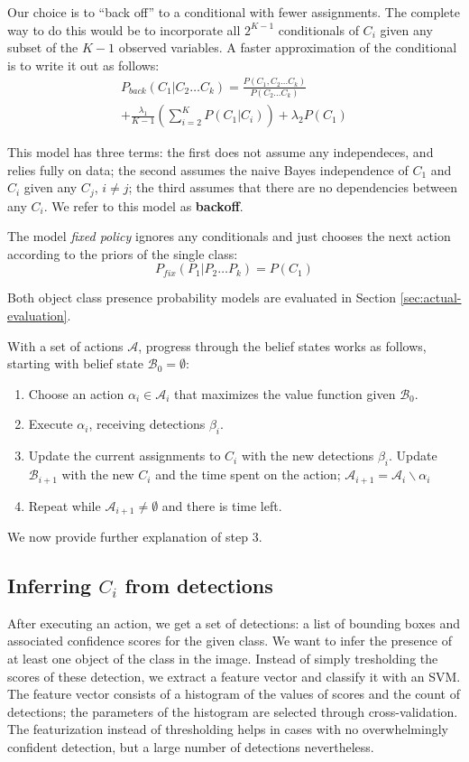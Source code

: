 Our choice is to ``back off'' to a conditional with fewer assignments.
The complete way to do this would be to incorporate all $2^{K-1}$ conditionals of $C_i$  given any subset of the $K-1$ observed variables.
A faster approximation of the conditional is to write it out as follows:
\begin{align*}
P_{back}(C_1 | C_2\ldots C_k) = \frac{P(C_1 , C_2\ldots C_k) }{P(C_2\ldots C_k)} \\
+ \frac{\lambda_1}{K-1} \left(\sum_{i=2}^K P(C_1|C_i) \right) + \lambda_2 P(C_1)
\end{align*}

This model has three terms: the first does not assume any independeces, and relies fully on data; the second assumes the naive Bayes independence of $C_1$ and $C_i$ given any $C_j$, $i\neq j$; the third assumes that there are no dependencies between any $C_i$.
We refer to this model as \textbf{backoff}.

The model \textit{fixed policy} ignores any conditionals and just chooses the next action according to the priors of the single class:
\begin{equation*}
P_{fix}(P_1|P_2\ldots P_k) = P(C_1)
\end{equation*}

Both object class presence probability models are evaluated in Section \ref{sec:actual-evaluation}.

With a set of actions $\mathcal{A}$, progress through the belief states works as follows, starting with belief state $\mathcal{B}_0 = \emptyset$:
\begin{enumerate}
 \item Choose an action $\alpha_i \in \mathcal{A}_i$ that maximizes the value function given $\mathcal{B}_0$.
 \item Execute $\alpha_i$, receiving detections $\beta_i$. 
 \item Update the current assignments to $C_i$ with the new detections $\beta_i$.
 Update $\mathcal{B}_{i+1}$ with the new $C_i$ and the time spent on the action;
 $\mathcal{A}_{i+1} = \mathcal{A}_i\backslash \alpha_i$
 \item Repeat while $\mathcal{A}_{i+1}\neq \emptyset$ and there is time left.
\end{enumerate}
We now provide further explanation of step 3.

\subsection{Inferring $C_i$ from detections}
After executing an action, we get a set of detections: a list of bounding boxes and associated confidence scores for the given class.
We want to infer the presence of at least one object of the class in the image.
Instead of simply tresholding the scores of these detection, we extract a feature vector and classify it with an SVM.
The feature vector consists of a histogram of the values of scores and the count of detections; the parameters of the histogram are selected through cross-validation.
The featurization instead of thresholding helps in cases with no overwhelmingly confident detection, but a large number of detections nevertheless.

